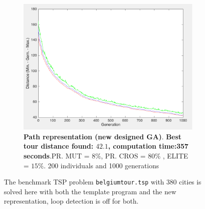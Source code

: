 \begin{figure}[!]
\begin{subfigure}{0.45\textwidth}
  \includegraphics[width=1\textwidth]{../figures/figures_question_4/path_vraag4_off_gen}
      \caption{\textbf{Path representation (new designed GA)}.  \textbf{Best tour distance found: $\mathbf{42.1}$, computation time:357 seconds}.PR. MUT = $8\%$, PR. CROS = $80\%$ , ELITE = $15\%$. 200 individuals and 1000 generations} 
      \label{fig:path_vraag4_off_gen}
\end{subfigure}
\caption{The benchmark TSP problem \texttt{belgiumtour.tsp} with 380 cities is solved here with both the template program and the new representation, loop detection is off for both.}
\label{fig:tour380_off}
\end{figure}
